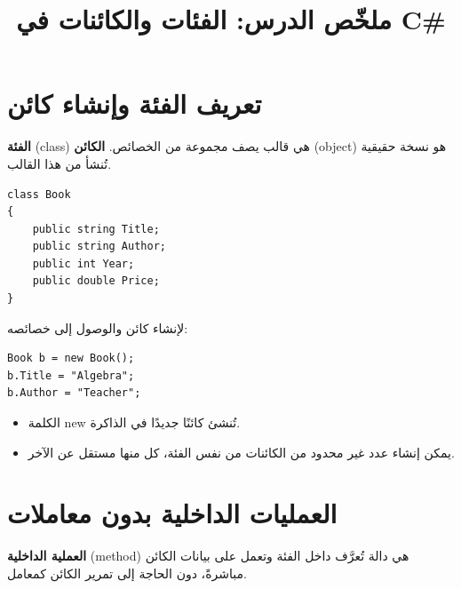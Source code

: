 \documentclass[14pt]{extarticle}
\title{ملخّص الدرس: الفئات والكائنات في \textenglish{C\#}}
\begin{document}
\maketitle
\thispagestyle{fancy}

\section{تعريف الفئة وإنشاء كائن}

\textbf{الفئة} (\textenglish{class}) هي قالب يصف مجموعة من الخصائص.
\textbf{الكائن} (\textenglish{object}) هو نسخة حقيقية تُنشأ من هذا القالب.

\begin{boxExample}
\begin{english}
\begin{verbatim}
class Book
{
    public string Title;
    public string Author;
    public int Year;
    public double Price;
}
\end{verbatim}
\end{english}
\end{boxExample}

لإنشاء كائن والوصول إلى خصائصه:

\begin{boxExample}
\begin{english}
\begin{verbatim}
Book b = new Book();
b.Title = "Algebra";
b.Author = "Teacher";
\end{verbatim}
\end{english}
\end{boxExample}

\begin{itemize}[itemsep=1pt]
    \item الكلمة \textenglish{new} تُنشئ كائنًا جديدًا في الذاكرة.
    \item يمكن إنشاء عدد غير محدود من الكائنات من نفس الفئة، كل منها مستقل عن الآخر.
\end{itemize}

\clearpage
\section{العمليات الداخلية بدون معاملات}

\textbf{العملية الداخلية} (\textenglish{method}) هي دالة تُعرَّف داخل الفئة وتعمل على بيانات الكائن مباشرةً، دون الحاجة إلى تمرير الكائن كمعامل.
\end{document}
